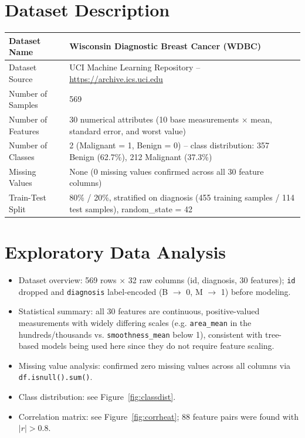 \documentclass[12pt,a4paper]{article}
\begin{document}
\section{Dataset Description}
\begin{longtable}{|p{6cm}|p{8cm}|}
\hline
Dataset Name & Wisconsin Diagnostic Breast Cancer (WDBC) \\ \hline
Dataset Source & UCI Machine Learning Repository -- \url{https://archive.ics.uci.edu} \\ \hline
Number of Samples & 569 \\ \hline
Number of Features & 30 numerical attributes (10 base measurements $\times$ mean, standard
error, and worst value) \\ \hline
Number of Classes & 2 (Malignant = 1, Benign = 0) -- class distribution: 357 Benign (62.7\%),
212 Malignant (37.3\%) \\ \hline
Missing Values & None (0 missing values confirmed across all 30 feature columns) \\ \hline
Train-Test Split & 80\% / 20\%, stratified on diagnosis (455 training samples / 114 test
samples), random\_state = 42 \\ \hline
\end{longtable}

\section{Exploratory Data Analysis}
\begin{itemize}
\item Dataset overview: 569 rows $\times$ 32 raw columns (id, diagnosis, 30 features); \texttt{id}
dropped and \texttt{diagnosis} label-encoded (B $\rightarrow$ 0, M $\rightarrow$ 1) before
modeling.
\item Statistical summary: all 30 features are continuous, positive-valued measurements with
widely differing scales (e.g. \texttt{area\_mean} in the hundreds/thousands vs.
\texttt{smoothness\_mean} below 1), consistent with tree-based models being used here since they
do not require feature scaling.
\item Missing value analysis: confirmed zero missing values across all columns via
\texttt{df.isnull().sum()}.
\item Class distribution: see Figure~\ref{fig:classdist}.
\item Correlation matrix: see Figure~\ref{fig:corrheat}; 88 feature pairs were found with
$|r| > 0.8$.
\end{itemize}
\end{document}
